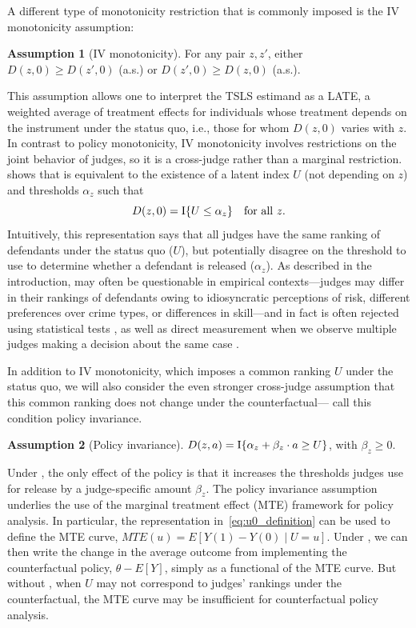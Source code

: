 \documentclass[12pt]{article}%
\theoremstyle{definition}
\newtheorem{assumption}{Assumption}
\newcommand\1{\operatorname{I}\indicatorfence}
\begin{document}
A different type of monotonicity restriction that is commonly imposed is the
\textcite{ImAn94} IV monotonicity assumption:
\begin{assumption}[IV monotonicity]\label{assumption:instrument_monotonicity}
  For any pair $z, z'$, either $D(z,0) \geq D(z',0)$ (a.s.) or $D(z',0) \geq D(z,0)$ (a.s.).
\end{assumption}
This assumption allows one to interpret the \ac{TSLS} estimand as a \acf{LATE},
a weighted average of treatment effects for individuals whose treatment depends
on the instrument under the status quo, i.e., those for whom $D(z,0)$ varies
with $z$. In contrast to policy monotonicity, IV monotonicity involves
restrictions on the joint behavior of judges, so it is a cross-judge rather than a marginal
restriction. \Textcite{vytlacil02} shows that
 is equivalent to the existence of a
latent index $U$ (not depending on $z$) and thresholds $\alpha_{z}$ such
that
\begin{equation}\label{eq:u0_definition}
  D(z,0) = \1{U \leq \alpha_{z}}\quad\text{for all $z$}.
\end{equation}
Intuitively, this representation says that all judges have the same ranking of
defendants under the status quo ($U$), but potentially disagree on the
threshold to use to determine whether a defendant is released ($\alpha_{z}$). As
described in the introduction,  may
often be questionable in empirical contexts---judges may differ in their
rankings of defendants owing to idiosyncratic perceptions of risk, different
preferences over crime types, or differences in skill---and in fact is often
rejected using statistical tests \parencite[e.g.][]{fll23}, as well as direct
measurement when we observe multiple judges making a decision about the same
case \parencite{sigstad_monotonicity_2023}.

In addition to IV monotonicity, which imposes a common ranking $U$ under the
status quo, we will also consider the even stronger cross-judge assumption that
this common ranking does not change under the
counterfactual---\textcite{HeVy07i,HeVy05} call this condition policy
invariance.
\begin{assumption}[Policy invariance]\label{assumption:single_index}
  $D(z, a)=\1{\alpha_{z} + \beta_z \cdot a \geq U}$, with $\beta_z \geq 0$.
\end{assumption}
Under , the only effect of the policy is that it
increases the thresholds judges use for release by a judge-specific amount
$\beta_{z}$. The policy invariance assumption underlies the use of the marginal
treatment effect (MTE) framework \parencite{HeVy99,HeVy05} for policy analysis.
In particular, the representation in~\cref{eq:u0_definition} can be used to
define the MTE curve, $MTE(u) = E[Y(1)-Y(0) \mid U=u]$. Under
, we can then write the change in the average
outcome from implementing the counterfactual policy, $\theta - E[Y]$, simply as
a functional of the MTE curve. But without , when
$U$ may not correspond to judges' rankings under the counterfactual, the MTE curve may be insufficient for
counterfactual policy analysis.
\end{document}
